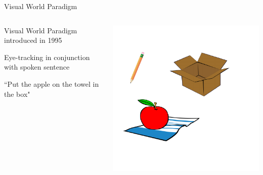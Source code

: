 \documentclass{beamer}
\begin{document}
\begin{frame}{Visual World Paradigm}
\begin{columns}
\begin{column}{0.45\textwidth}

Visual World Paradigm introduced in 1995 \vspace{4mm}

Eye-tracking in conjunction with spoken sentence  \vspace{4mm}

``Put the apple on the towel in the box" 


\end{column}
\begin{column}{0.5\textwidth}  %
\begin{center}
\includegraphics[scale=.9]{img/towel_apple_box.pdf}
\end{center}
\end{column}
\end{columns}
\end{frame}

\end{document}
